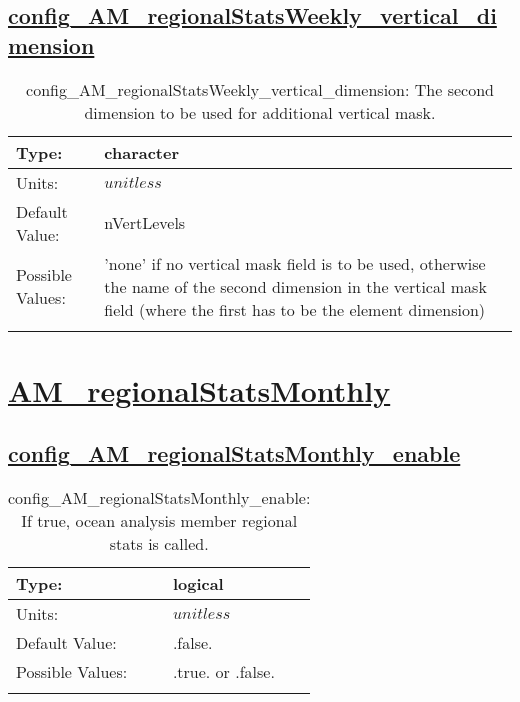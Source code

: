 \subsection[config\_AM\_regionalStatsWeekly\_vertical\_dimension]{\hyperref[sec:nm_tab_AM_regionalStatsWeekly]{config\_AM\_regionalStatsWeekly\_vertical\_dimension}}
\label{subsec:nm_sec_config_AM_regionalStatsWeekly_vertical_dimension}
\begin{center}
\begin{longtable}{| p{2.0in} || p{4.0in} |}
    \hline
    Type: & character \\
    \hline
    Units: & $unitless$ \\
    \hline
    Default Value: & nVertLevels \\
    \hline
    Possible Values: & 'none' if no vertical mask field is to be used, otherwise the name of the second dimension in the vertical mask field (where the first has to be the element dimension) \\
    \hline
    \caption{config\_AM\_regionalStatsWeekly\_vertical\_dimension: The second dimension to be used for additional vertical mask.}
\end{longtable}
\end{center}
\section[AM\_regionalStatsMonthly]{\hyperref[sec:nm_tab_AM_regionalStatsMonthly]{AM\_regionalStatsMonthly}}
\label{sec:nm_sec_AM_regionalStatsMonthly}
\subsection[config\_AM\_regionalStatsMonthly\_enable]{\hyperref[sec:nm_tab_AM_regionalStatsMonthly]{config\_AM\_regionalStatsMonthly\_enable}}
\label{subsec:nm_sec_config_AM_regionalStatsMonthly_enable}
\begin{center}
\begin{longtable}{| p{2.0in} || p{4.0in} |}
    \hline
    Type: & logical \\
    \hline
    Units: & $unitless$ \\
    \hline
    Default Value: & .false. \\
    \hline
    Possible Values: & .true. or .false. \\
    \hline
    \caption{config\_AM\_regionalStatsMonthly\_enable: If true, ocean analysis member regional stats is called.}
\end{longtable}
\end{center}
